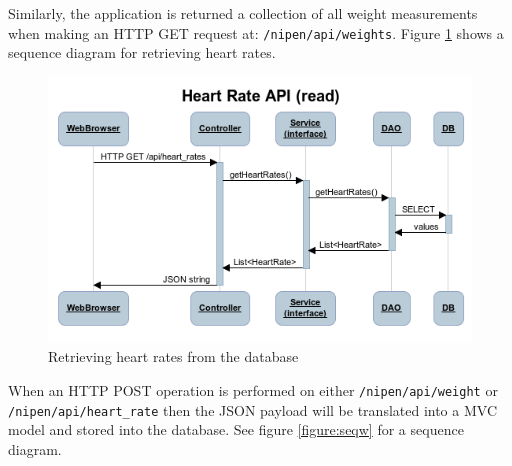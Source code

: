 Similarly, the application is returned a collection of all weight measurements when making an HTTP GET
request at: \verb|/nipen/api/weights|. Figure \ref{figure:seqhr} shows
a sequence diagram for retrieving heart rates.

\begin{figure}[h]
\centering
\includegraphics[scale=0.8]{../Figures/seqhr.png}
\caption{Retrieving heart rates from the database}
\label{figure:seqhr}
\end{figure}

When an HTTP POST operation is performed on either \verb|/nipen/api/weight| or \newline
\verb|/nipen/api/heart_rate| then the JSON payload will be translated into a MVC model and
stored into the database. See figure \ref{figure:seqw} for a sequence diagram.

